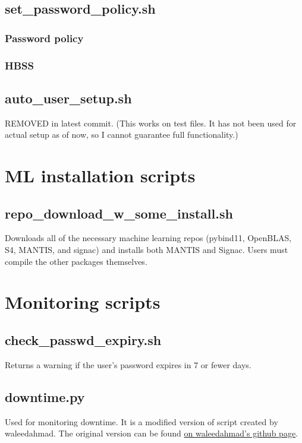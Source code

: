\documentclass[10pt,letterpaper]{report}
\begin{document}
\section{set\_password\_policy.sh} 	\label{sec:passwd}
\subsection{Password policy} 		\label{subsec:passwdpolicy}
	
\subsection{HBSS}					\label{subsec:HBSS}
	

\section{auto\_user\_setup.sh}			\label{sec:users}
REMOVED in latest commit. (This works on test files. It has not been used for actual setup as of now, so I cannot guarantee full functionality.)

\chapter{ML installation scripts}		\label{ch:install}

\section{repo\_download\_w\_some\_install.sh}	\label{sec:repoDL}
Downloads all of the necessary machine learning repos (pybind11, OpenBLAS, S4, MANTIS, and signac) and installs both MANTIS and Signac. Users must compile the other packages themselves.

	

\chapter{Monitoring scripts}		\label{ch:monitor}

\section{check\_passwd\_expiry.sh}	\label{sec:passwdExp}
Returns a warning if the user's password expires in 7 or fewer days.

\section{downtime.py}				\label{sec:downtime}
Used for monitoring downtime. It is a modified version of script created by waleedahmad. The original version can be found \href{https://gist.github.com/waleedahmad/326ec53f76646dccec299910a7fb4f2b}{on waleedahmad's github page}.
\end{document}
